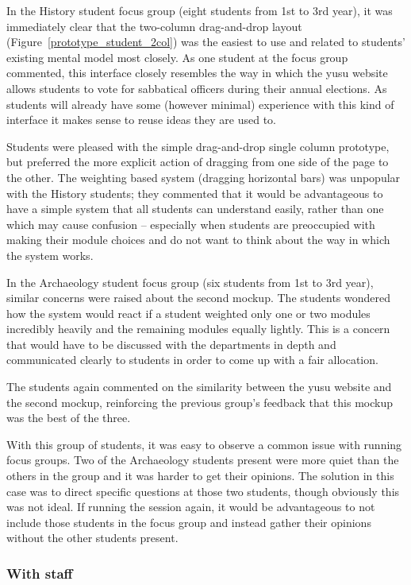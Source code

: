 \documentclass[]{scrartcl}
\begin{document}
In the History student focus group (eight students from 1st to 3rd year), it
was immediately clear that the two-column drag-and-drop layout
(Figure~\ref{prototype_student_2col}) was the easiest to use and related to
students' existing mental model most closely. As one student at the focus
group commented, this interface closely resembles the way in which the
\gls{yusu} website allows students to vote for sabbatical officers during
their annual elections. As students will already have some (however minimal)
experience with this kind of interface it makes sense to reuse ideas they are
used to.

Students were pleased with the simple drag-and-drop single column prototype,
but preferred the more explicit action of dragging from one side of the page
to the other. The weighting based system (dragging horizontal bars) was
unpopular with the History students; they commented that it would be
advantageous to have a simple system that all students can understand easily,
rather than one which may cause confusion -- especially when students are
preoccupied with making their module choices and do not want to think about
the way in which the system works.

In the Archaeology student focus group (six students from 1st to 3rd year),
similar concerns were raised about the second mockup. The students wondered
how the system would react if a student weighted only one or two modules
incredibly heavily and the remaining modules equally lightly. This is a
concern that would have to be discussed with the departments in depth and
communicated clearly to students in order to come up with a fair allocation.

The students again commented on the similarity between the \gls{yusu} website
and the second mockup, reinforcing the previous group's feedback that this
mockup was the best of the three.

With this group of students, it was easy to observe a common issue with
running focus groups. Two of the Archaeology students present were more
quiet than the others in the group and it was harder to get their opinions.
The solution in this case was to direct specific questions at those two
students, though obviously this was not ideal. If running the session again,
it would be advantageous to not include those students in the focus group
and instead gather their opinions without the other students present.

\subsubsection{With staff}
\end{document}
